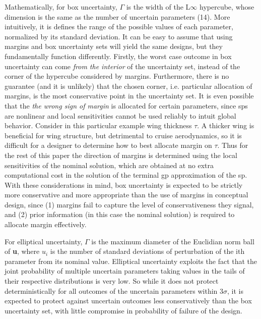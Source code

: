 Mathematically, for box uncertainty,
$\Gamma$ is the width of the L$\infty$ hypercube, whose dimension is the same as the number of uncertain parameters (14).
More intuitively,
it is defines the range of the possible values of each parameter, normalized by its standard deviation.
It can be easy to assume that using margins and box uncertainty sets will yield the same designs,
but they fundamentally function differently.
Firstly, the worst case outcome in box uncertainty can come \emph{from the interior} of the uncertainty
set, instead of the corner of the hypercube considered
by margins. Furthermore, there is no guarantee (and it is unlikely)
that the chosen corner, i.e. particular allocation of margins,
is the most conservative point in the uncertainty set.
It is even possible that the \emph{the wrong sign of margin} is allocated for certain parameters,
since \gls{sp}s are nonlinear and local sensitivities cannot be used reliably to intuit global behavior. Consider
in this particular example wing thickness $\tau$.
A thicker wing is beneficial for wing structure, but detrimental to cruise aerodynamics, so it is difficult
for a designer to determine how to best allocate margin on $\tau$. Thus for the rest
of this paper the direction of margins is determined using the local sensitivities of the nominal solution,
which are obtained at no extra computational cost in the solution of the terminal \gls{gp} approximation of the \gls{sp}.
With these considerations in mind, box uncertainty is expected to be strictly more conservative
and more appropriate than the use of margins
in conceptual design, since (1) margins fail to capture the level of conservativeness they signal, and (2) prior
information (in this case the nominal solution) is required to allocate margin effectively.

For elliptical uncertainty, $\Gamma$ is the maximum diameter of the Euclidian norm
ball of \textbf{u}, where $u_i$ is the number of standard deviations of perturbation of the
ith parameter from its nominal value.
Elliptical uncertainty exploits the fact that the joint probability of
multiple uncertain parameters taking values in the tails of their respective distributions is
very low. So while it does not protect deterministically for all outcomes of the uncertain
parameters within $3\sigma$, it is expected to protect against uncertain outcomes
less conservatively than the box uncertainty set, with little compromise in probability of failure
of the design.
